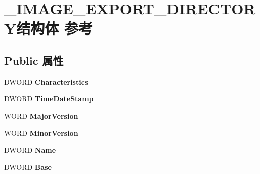 \hypertarget{struct___i_m_a_g_e___e_x_p_o_r_t___d_i_r_e_c_t_o_r_y}{}\section{\+\_\+\+I\+M\+A\+G\+E\+\_\+\+E\+X\+P\+O\+R\+T\+\_\+\+D\+I\+R\+E\+C\+T\+O\+R\+Y结构体 参考}
\label{struct___i_m_a_g_e___e_x_p_o_r_t___d_i_r_e_c_t_o_r_y}
\subsection*{Public 属性}
\begin{DoxyCompactItemize}
\item 
\mbox{\label{struct___i_m_a_g_e___e_x_p_o_r_t___d_i_r_e_c_t_o_r_y_ae45b4de0b363b942a638b8b13b2dfae7}} 
D\+W\+O\+RD {\bfseries Characteristics}
\item 
\mbox{\label{struct___i_m_a_g_e___e_x_p_o_r_t___d_i_r_e_c_t_o_r_y_ad69d1ce623cb785d7c568aaca6538987}} 
D\+W\+O\+RD {\bfseries Time\+Date\+Stamp}
\item 
\mbox{\label{struct___i_m_a_g_e___e_x_p_o_r_t___d_i_r_e_c_t_o_r_y_af9edad66e931c2d1b67510bf7ef03eea}} 
W\+O\+RD {\bfseries Major\+Version}
\item 
\mbox{\label{struct___i_m_a_g_e___e_x_p_o_r_t___d_i_r_e_c_t_o_r_y_ac735d9b0fc0e307c547ecab3f2db17d2}} 
W\+O\+RD {\bfseries Minor\+Version}
\item 
\mbox{\label{struct___i_m_a_g_e___e_x_p_o_r_t___d_i_r_e_c_t_o_r_y_af970e435a2c101a87f31bceec578c8bf}} 
D\+W\+O\+RD {\bfseries Name}
\item 
\mbox{\label{struct___i_m_a_g_e___e_x_p_o_r_t___d_i_r_e_c_t_o_r_y_a9505c79da4d21d3a95df0cde5110c38e}} 
D\+W\+O\+RD {\bfseries Base}
\item 
\mbox{\label{struct___i_m_a_g_e___e_x_p_o_r_t___d_i_r_e_c_t_o_r_y_ae74873a2b7c0e6841ffbd51a3591a83d}} 

\end{DoxyCompactItemize}
